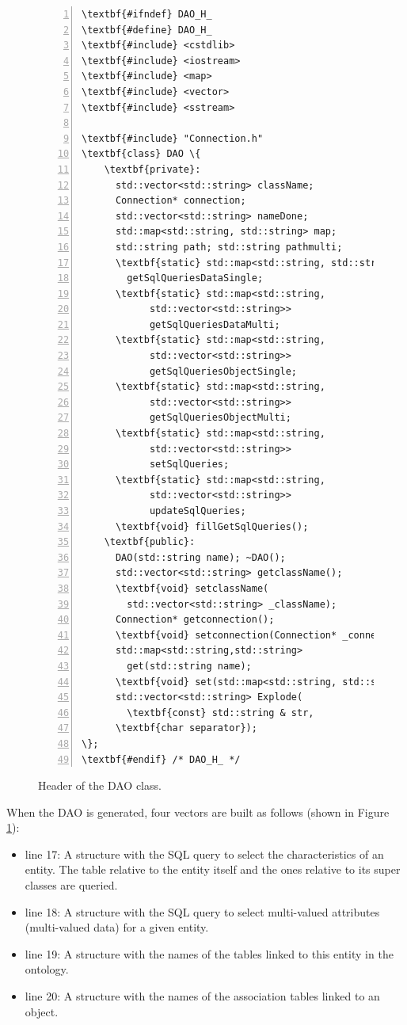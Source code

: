 \begin{figure}[t!h!]
\begin{minipage}{.45\paperwidth}
\begin{mylisting}
\begin{Verbatim}[commandchars=\\\{\},fontsize=\footnotesize, numbers=left, numbersep=2pt]
\textbf{#ifndef} DAO_H_
\textbf{#define} DAO_H_
\textbf{#include} <cstdlib>
\textbf{#include} <iostream>
\textbf{#include} <map>
\textbf{#include} <vector>
\textbf{#include} <sstream>

\textbf{#include} "Connection.h"
\textbf{class} DAO \{
    \textbf{private}:
      std::vector<std::string> className;
      Connection* connection;
      std::vector<std::string> nameDone;
      std::map<std::string, std::string> map;
      std::string path; std::string pathmulti;
      \textbf{static} std::map<std::string, std::string>
        getSqlQueriesDataSingle;
      \textbf{static} std::map<std::string, 
			std::vector<std::string>>
			getSqlQueriesDataMulti;
      \textbf{static} std::map<std::string, 
			std::vector<std::string>>
			getSqlQueriesObjectSingle;
      \textbf{static} std::map<std::string, 
			std::vector<std::string>>
			getSqlQueriesObjectMulti;
      \textbf{static} std::map<std::string, 
			std::vector<std::string>>
			setSqlQueries;
      \textbf{static} std::map<std::string, 
			std::vector<std::string>>
			updateSqlQueries;
      \textbf{void} fillGetSqlQueries();
    \textbf{public}:
      DAO(std::string name); ~DAO();
      std::vector<std::string> getclassName();
      \textbf{void} setclassName(
		std::vector<std::string> _className);
      Connection* getconnection();
      \textbf{void} setconnection(Connection* _connection);
      std::map<std::string,std::string> 
      	get(std::string name);
      \textbf{void} set(std::map<std::string, std::string> data);
      std::vector<std::string> Explode(
		\textbf{const} std::string & str,
      \textbf{char separator});
\};
\textbf{#endif} /* DAO_H_ */
\end{Verbatim}
\end{mylisting}
\end{minipage}
\caption{Header of the DAO class.}
\label{fig:headerdao}
\end{figure}

When the DAO is generated, four vectors are built as follows (shown in Figure \ref{fig:headerdao}):

\begin{itemize}
\item line 17: A structure with the SQL query to select the characteristics of an entity. The table
relative to the entity itself and the ones relative to its super classes are queried.
\item line 18: A structure with the SQL query to select multi-valued attributes (multi-valued data) for a given entity.
\item line 19: A structure with the names of the tables linked to this entity in the ontology.
\item line 20: A structure with the names of the association tables linked to an object.
\end{itemize}

